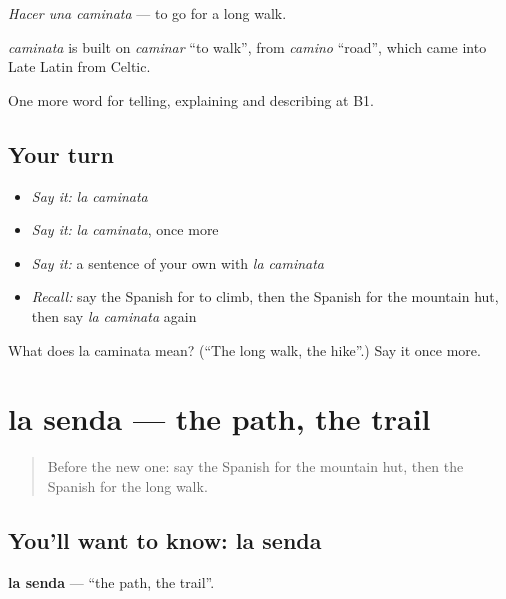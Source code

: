 \emph{Hacer una caminata} — to go for a long walk.

\begin{cousinweb}
\emph{caminata} is built on \emph{caminar} \textquotedblleft{}to walk\textquotedblright{}, from \emph{camino} \textquotedblleft{}road\textquotedblright{}, which came into Late Latin from Celtic.
\end{cousinweb}

\begin{grammarlens}[title={What you've built}]
One more word for telling, explaining and describing at B1.
\end{grammarlens}

\subsection*{Your turn}
\begin{itemize}
\raggedright
  \item \emph{Say it:} \emph{la caminata}
  \item \emph{Say it:} \emph{la caminata}, once more
  \item \emph{Say it:} a sentence of your own with \emph{la caminata}
  \item \emph{Recall:} say the Spanish for to climb, then the Spanish for the mountain hut, then say \emph{la caminata} again
\end{itemize}

\begin{tcolorbox}[breakable,colback=teal!4,colframe=teal!35!black,title={Before you move on}]
What does la caminata mean? (\textquotedblleft{}The long walk, the hike\textquotedblright{}.) Say it once more.
\end{tcolorbox}
\section[la senda]{la senda — the path, the trail}

\label{lesson:ES-C687-senda}



\begin{quote}
Before the new one: say the Spanish for the mountain hut, then the Spanish for the long walk.
\end{quote}

\subsection*{You'll want to know: la senda}
\textbf{la senda} — \textquotedblleft{}the path, the trail\textquotedblright{}.

